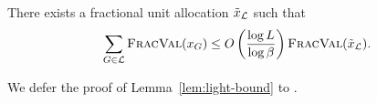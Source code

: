\begin{lemma}
    \label{lem:light-bound}
    There exists a fractional unit allocation $\tilde{x}_{\mathcal{L}}$ such that 
    \[
        \sum_{G\in{\mathcal{L}}} {\normalfont\textsc{FracVal}}(x_G) \le
        O\left(\frac{\log L}{\log\beta}\right){\normalfont\textsc{FracVal}}(\tilde{x}_{\mathcal{L}}).
    \]
\end{lemma}

We defer the proof of Lemma~\ref{lem:light-bound} to .


